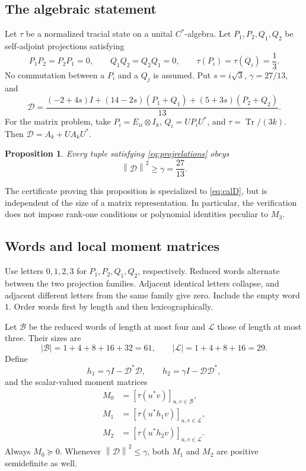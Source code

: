 \documentclass[11pt]{article}
\newtheorem{proposition}[theorem]{Proposition}
\theoremstyle{definition}\newtheorem{definition}[theorem]{Definition}
\theoremstyle{remark}\newtheorem{remark}[theorem]{Remark}
\newcommand{\Tr}{\operatorname{Tr}}
\newcommand{\norm}[1]{\left\lVert#1\right\rVert}
\newcommand{\Bwords}{\mathcal B}
\newcommand{\Lwords}{\mathcal L}
\begin{document}
\subsection{The algebraic statement}
Let $\tau$ be a normalized tracial state on a unital $C^*$-algebra. Let $P_1,P_2,Q_1,Q_2$ be self-adjoint projections satisfying
\begin{equation}\label{eq:projrelations}
 P_1P_2=P_2P_1=0,\qquad Q_1Q_2=Q_2Q_1=0,
 \qquad \tau(P_i)=\tau(Q_i)=\frac13.
\end{equation}
No commutation between a $P_i$ and a $Q_j$ is assumed. Put $s=i\sqrt3$, $\gamma=27/13$, and
\begin{equation}\label{eq:calD}
 \mathcal D=\frac{(-2+4s)I+(14-2s)(P_1+Q_1)+(5+3s)(P_2+Q_2)}{13}.
\end{equation}
For the matrix problem, take $P_i=E_{ii}\otimes I_k$, $Q_i=UP_iU^*$, and $\tau=\Tr/(3k)$. Then $\mathcal D=A_k+UA_kU^*$.

\begin{proposition}\label{prop:tracial}
Every tuple satisfying \eqref{eq:projrelations} obeys
\[
 \norm{\mathcal D}^2\ge\gamma=\frac{27}{13}.
\]
\end{proposition}

The certificate proving this proposition is specialized to \eqref{eq:calD}, but is independent of the size of a matrix representation. In particular, the verification does not impose rank-one conditions or polynomial identities peculiar to $M_3$.

\subsection{Words and local moment matrices}
Use letters $0,1,2,3$ for $P_1,P_2,Q_1,Q_2$, respectively. Reduced words alternate between the two projection families. Adjacent identical letters collapse, and adjacent different letters from the same family give zero. Include the empty word $1$. Order words first by length and then lexicographically.

Let $\Bwords$ be the reduced words of length at most four and $\Lwords$ those of length at most three. Their sizes are
\[
 |\Bwords|=1+4+8+16+32=61,\qquad |\Lwords|=1+4+8+16=29.
\]
Define
\[
 h_1=\gamma I-\mathcal D^*\mathcal D,
 \qquad h_2=\gamma I-\mathcal D\mathcal D^*,
\]
and the scalar-valued moment matrices
\begin{align*}
 M_0&=[\tau(u^*v)]_{u,v\in\Bwords},\\
 M_1&=[\tau(u^*h_1v)]_{u,v\in\Lwords},\\
 M_2&=[\tau(u^*h_2v)]_{u,v\in\Lwords}.
\end{align*}
Always $M_0\succeq0$. Whenever $\norm{\mathcal D}^2\le\gamma$, both $M_1$ and $M_2$ are positive semidefinite as well.
\end{document}
